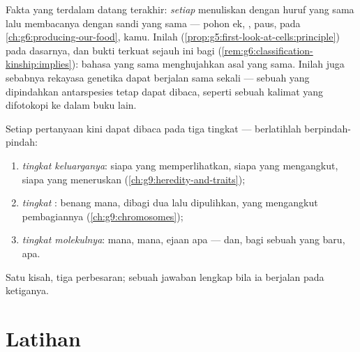 \begin{remark}\label{rem:g9:genes-and-dna:universal}
Fakta yang terdalam datang terakhir: \emph{setiap}  menuliskan  dengan huruf  yang sama lalu
membacanya dengan sandi yang sama --- pohon ek, , paus,
 pada \cref{ch:g6:producing-our-food}, kamu. Inilah
(\cref{prop:g5:first-look-at-cells:principle}) pada
dasarnya, dan bukti terkuat sejauh ini bagi  (\cref{rem:g6:classification-kinship:implies}):
bahasa yang sama menghujahkan asal yang sama. Inilah juga
sebabnya rekayasa genetika dapat berjalan sama sekali ---
sebuah  yang dipindahkan antarspesies tetap dapat dibaca,
seperti sebuah kalimat yang difotokopi ke dalam buku lain.
\end{remark}

\begin{method}\label{met:g9:genes-and-dna:levels}
Setiap pertanyaan  kini dapat dibaca pada
tiga tingkat --- berlatihlah berpindah-pindah:
\begin{enumerate}
  \item \emph{tingkat keluarganya}: siapa yang
        memperlihatkan, siapa yang mengangkut, siapa yang
        meneruskan (\cref{ch:g9:heredity-and-traits});
  \item \emph{tingkat }: benang mana, dibagi dua
        lalu dipulihkan, yang mengangkut pembagiannya
        (\cref{ch:g9:chromosomes});
  \item \emph{tingkat molekulnya}:  mana,  mana,
        ejaan apa --- dan, bagi sebuah  yang baru,
         apa.
\end{enumerate}
Satu kisah, tiga perbesaran; sebuah jawaban lengkap bila ia
berjalan pada ketiganya.
\end{method}

\section{Latihan}

